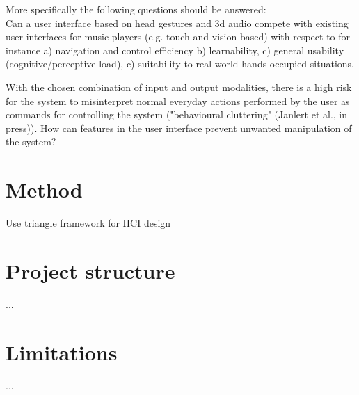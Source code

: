 More specifically the following questions should be answered:\\
Can a user interface based on head gestures and 3d audio compete with existing user interfaces for music players (e.g. touch and vision-based) with respect to for instance a) navigation and control efficiency b) learnability, c) general usability (cognitive/perceptive load), c) suitability to real-world hands-occupied situations. 

With the chosen combination of input and output modalities, there is a high risk for the system to misinterpret normal everyday actions performed by the user as commands for controlling the system ("behavioural cluttering" (Janlert et al., in press)). How can features in the user interface prevent unwanted manipulation of the system?

\section{Method}
Use triangle framework for HCI design \cite{mackay_hci_1997}


\section{Project structure}
...

\section{Limitations}
...




